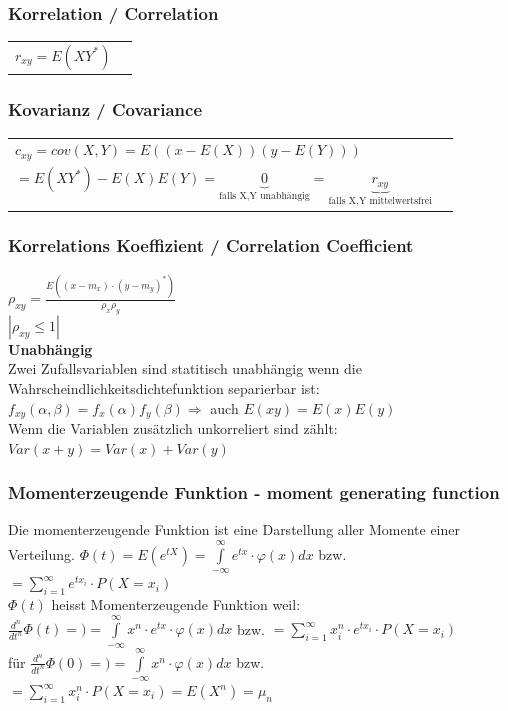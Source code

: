 		\subsubsection{Korrelation / Correlation}
		\begin{tabular}{ll}
        $r_{xy}=E(XY^*)$
        \end{tabular}
		\subsubsection{Kovarianz / Covariance}
		\begin{tabular}{ll}
        $c_{xy}=cov(X,Y)=E((x-E(X))(y-E(Y)))$\\$=E(XY^*)-E(X)E(Y)=\underbrace{0}_{\text{falls X,Y unabhängig}}=
        \underbrace{r_{xy}}_{\text{falls X,Y mittelwertsfrei}}$
        \end{tabular}
        \subsubsection{Korrelations Koeffizient / Correlation Coefficient}
		$\rho_{xy}=\frac{E((x-m_x)\cdot(y-m_y)^*)}{\rho_x \rho_y}$\\
		$|\rho_{xy}\leq 1|$ \\ 
		\textbf{Unabhängig}\\
		Zwei Zufallsvariablen sind statitisch unabhängig wenn die Wahrscheindlichkeitsdichtefunktion separierbar ist: \\
		$f_{xy}(\alpha, \beta) = f_x(\alpha)f_y(\beta) \Longrightarrow$ auch $E(xy)=E(x)E(y)$ \\
		Wenn die Variablen zusätzlich unkorreliert sind zählt: $Var(x+y) = Var(x) + Var(y)$
		
		
		
	\subsubsection{Momenterzeugende Funktion - moment generating function}
		Die momenterzeugende Funktion ist eine Darstellung aller Momente einer Verteilung. 
		$\Phi(t)=E(e^{tX})=\int\limits_{-\infty}^\infty e^{tx} \cdot \varphi(x) dx$ bzw. $= \sum\limits_{i=1}^{\infty}e^{tx_i} \cdot P(X=x_i)$	\\
		$\Phi(t)$ heisst Momenterzeugende Funktion weil: \\
		$\frac{d^n}{dt^n}\Phi(t)=)=\int\limits_{-\infty}^\infty x^n \cdot e^{tx} \cdot \varphi(x) dx$ bzw. $= \sum\limits_{i=1}^{\infty} x_i^n \cdot e^{tx_i} \cdot P(X=x_i)$\\
		für $\frac{d^n}{dt^n}\Phi(0)=)=\int\limits_{-\infty}^\infty x^n \cdot \varphi(x) dx$ bzw. $= \sum\limits_{i=1}^{\infty} x_i^n \cdot P(X=x_i) = E(X^n)=\mu_n $\\
		
